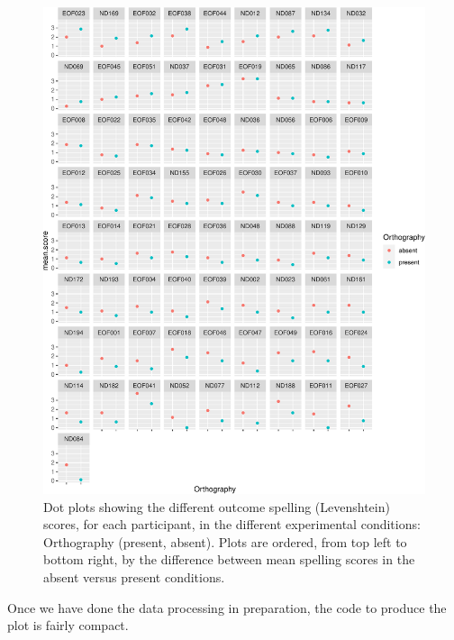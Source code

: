 \documentclass[
  letterpaper,
  DIV=11,
  numbers=noendperiod]{scrreprt}
\begin{document}
\begin{figure}[H]

{\centering \includegraphics{visualization_files/figure-pdf/fig-effects-dot-facet-grid-effect-1.pdf}

}

\caption{\label{fig-effects-dot-facet-grid-effect}Dot plots showing the
different outcome spelling (Levenshtein) scores, for each participant,
in the different experimental conditions: Orthography (present, absent).
Plots are ordered, from top left to bottom right, by the difference
between mean spelling scores in the absent versus present conditions.}

\end{figure}

Once we have done the data processing in preparation, the code to
produce the plot is fairly compact.
\end{document}

